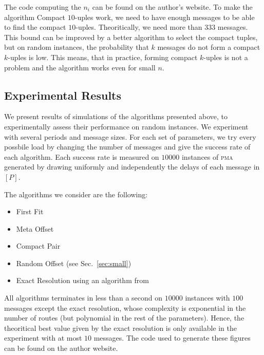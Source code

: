 \documentclass[10pt, conference, letterpaper]{IEEEtran}
\newcommand\pma{\textsc{pma}\xspace}
\begin{document}
The code computing the $n_i$ can be found on the author's website.
To make the algorithm Compact $10$-uples work, we need to have enough messages to be able to
find the compact $10$-uples. Theoritically, we need more than $333$ messages. This bound can be improved
by a better algorithm to select the compact tuples, but on random instances, the probability that 
$k$ messages do not form a compact $k$-uples is low. This means, that in practice, forming compact $k$-uples
is not a problem and the algorithm works even for small $n$.

\subsection{Experimental Results} \label{sec:perf_large}

We present results of simulations of the algorithms presented above, to experimentally assess their performance on
random instances. We experiment with several periods and message sizes. For each set of parameters, we try every possbile load by changing the number of messages and give the success rate of each algorithm. Each success rate is measured on $10000$ instances of \pma generated by drawing uniformly and independently the delays of each message in $[P]$. 

The algorithms we consider are the following:
\begin{itemize}
	\item First Fit
	\item Meta Offset
	\item Compact Pair
	\item Random Offset (see Sec.~\ref{sec:small})
	\item Exact Resolution using an algorithm from~\cite{dominique2018deterministic}  
\end{itemize}

All algorithms terminates in less than a second on $10000$ instances with $100$ messages except the 
exact resolution, whose complexity is exponential in the number of routes (but polynomial in the rest of the parameters).
Hence, the theoritical best value given by the exact resolution is only available in the experiment with at most $10$ messages. The code used to generate these figures can be found on the author website.
\end{document}
